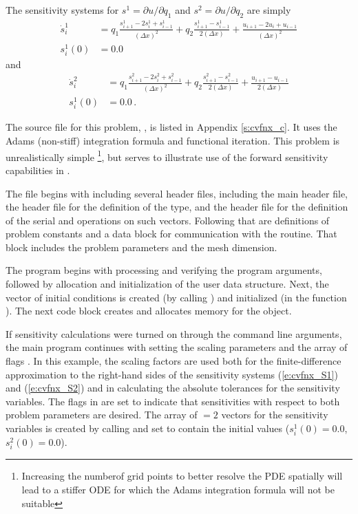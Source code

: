 The sensitivity systems for $s^1 = \partial u / \partial q_1$ and
$s^2 = \partial u / \partial q_2$ are simply
\begin{equation}\label{e:cvfnx_S1}
  \begin{split}
    \dot{s}^1_i 
    &= q_1 \frac{s^1_{i+1}-2s^1_{i}+s^1_{i-1}}{(\Delta x)^{2}}
    + q_2 \frac{s^1_{i+1}-s^1_{i-1}}{2(\Delta x)} 
    + \frac{u_{i+1}-2u_{i}+u_{i-1}}{(\Delta x)^{2}} \\
    s^1_i (0) &= 0.0 
  \end{split}
\end{equation}
and
\begin{equation}\label{e:cvfnx_S2}
  \begin{split}
    \dot{s}^2_i 
    &= q_1 \frac{s^2_{i+1}-2s^2_{i}+s^2_{i-1}}{(\Delta x)^{2}}
    + q_2 \frac{s^2_{i+1}-s^2_{i-1}}{2(\Delta x)} 
    + \frac{u_{i+1}-u_{i-1}}{2(\Delta x)} \\
    s^1_i (0) &= 0.0  \, .
  \end{split}
\end{equation}

The source file for this problem, , is listed in Appendix
\ref{s:cvfnx_c}.  It uses the Adams (non-stiff) integration formula and
functional iteration.  This problem is unrealistically simple
\footnote{Increasing the numberof grid points to better resolve the PDE spatially
will lead to a stiffer ODE for which the Adams integration formula will not
be suitable}, but serves to illustrate use of the forward sensitivity 
capabilities in {\cvodes}.

The  file begins with including several header files, including 
the main {\cvodes} header file, the  header file for the
definition of the  type, and the {\nvecs} header file 
for the definition of the serial  and operations on such vectors.
Following that are definitions of problem constants and a data block for communication
with the  routine.  That block includes the problem parameters and the mesh 
dimension.

The  program begins with processing and verifying the program arguments,
followed by allocation and initialization of the user data structure. Next, the
vector of initial conditions is created (by calling ) and
initialized (in the function ). The next code block creates and allocates
memory for the {\cvodes} object. 

If sensitivity calculations were turned on through the command line arguments,
the main program continues with setting the scaling parameters
 and the array of flags . In this example,
the scaling factors  are used both for the finite-difference approximation
to the right-hand sides of the sensitivity systems (\ref{e:cvfnx_S1}) 
and (\ref{e:cvfnx_S2}) and in calculating the absolute tolerances for the 
sensitivity variables. 
The flags in  are set to indicate that sensitivities with respect to both 
problem parameters are desired.
The array of  $=2$ vectors  for the sensitivity variables is created
by calling  and set to contain the initial values
($s^1_i(0) = 0.0$, $s^2_i(0) = 0.0$).

